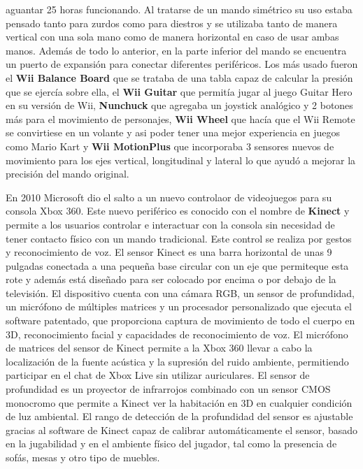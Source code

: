 aguantar 25 horas funcionando. Al tratarse de un mando sim\'etrico su uso estaba pensado tanto para zurdos como para diestros y se utilizaba tanto de manera vertical con una sola mano como de manera horizontal en caso de usar ambas manos. Adem\'as de todo lo anterior, en la parte inferior del mando se encuentra un puerto de expansi\'on para conectar diferentes perif\'ericos. Los m\'as usado fueron el \textbf{Wii Balance Board} que se trataba de una tabla capaz de calcular la presi\'on que se ejerc\'ia sobre ella, el \textbf{Wii Guitar} que permit\'ia jugar al juego Guitar Hero en su versi\'on de Wii, \textbf{Nunchuck} que agregaba un joystick anal\'ogico y 2 botones m\'as para el movimiento de personajes, \textbf{Wii Wheel} que hac\'ia que el Wii Remote se convirtiese en un volante y asi poder tener una mejor experiencia en juegos como Mario Kart y \textbf{Wii MotionPlus} que incorporaba 3 sensores nuevos de movimiento para los ejes vertical, longitudinal y lateral lo que ayud\'o a mejorar la precisi\'on del mando original.\par

En 2010 Microsoft dio el salto a un nuevo controlaor de videojuegos para su consola Xbox 360. Este nuevo perif\'erico es conocido con el nombre de \textbf{Kinect} y permite a los usuarios controlar e interactuar con la consola sin necesidad de tener contacto f\'isico con un mando tradicional. Este control se realiza por gestos y reconocimiento de voz. El sensor Kinect es una barra horizontal de unas 9 pulgadas conectada a una peque\~na base circular con un eje que permiteque esta rote y adem\'as est\'a dise\~nado para ser colocado por encima o por debajo de la televisi\'on. El dispositivo cuenta con una c\'amara RGB, un sensor de profundidad, un micr\'ofono de m\'ultiples matrices y un procesador personalizado que ejecuta el software patentado, que proporciona captura de movimiento de todo el cuerpo en 3D, reconocimiento facial y capacidades de reconocimiento de voz. El micr\'ofono de matrices del sensor de Kinect permite a la Xbox 360 llevar a cabo la localizaci\'on de la fuente ac\'ustica y la supresi\'on del ruido ambiente, permitiendo participar en el chat de Xbox Live sin utilizar auriculares. El sensor de profundidad es un proyector de infrarrojos combinado con un sensor CMOS monocromo que permite a Kinect ver la habitaci\'on en 3D en cualquier condici\'on de luz ambiental. El rango de detecci\'on de la profundidad del sensor es ajustable gracias al software de Kinect capaz de calibrar autom\'aticamente el sensor, basado en la jugabilidad y en el ambiente f\'isico del jugador, tal como la presencia de sof\'as, mesas y otro tipo de muebles.\par


